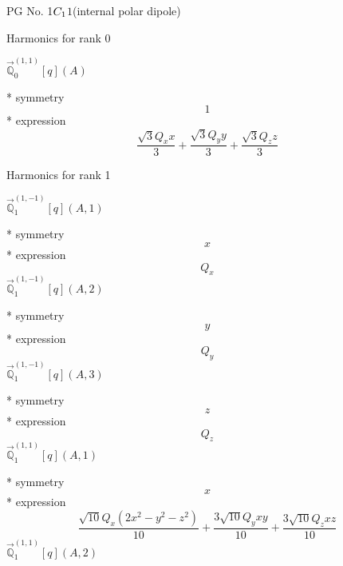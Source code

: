 \documentclass[fleqn,8pt]{jsarticle}
\begin{document}
\setcounter{MaxMatrixCols}{32}

\renewcommand{\tablename}{Table~}
\renewcommand{\figurename}{Figure~}
\begin{center}
\LARGE
PG No. 1\quad$C_{\rm 1}$\quad$1$\quad[ triclinic ] (internal polar dipole)
\end{center}

\noindent * Harmonics for rank 0

\noindent\quad $\vec{\mathbb{Q}}_{0}^{(1,1)}[q](A)$

\noindent\quad ** symmetry
\begin{dmath*}
1
\end{dmath*}
\noindent\quad ** expression
\begin{dmath*}
\frac{\sqrt{3} Q_{x} x}{3} + \frac{\sqrt{3} Q_{y} y}{3} + \frac{\sqrt{3} Q_{z} z}{3}
\end{dmath*}

\noindent * Harmonics for rank 1

\noindent\quad $\vec{\mathbb{Q}}_{1}^{(1,-1)}[q](A,1)$

\noindent\quad ** symmetry
\begin{dmath*}
x
\end{dmath*}
\noindent\quad ** expression
\begin{dmath*}
Q_{x}
\end{dmath*}
\noindent\quad $\vec{\mathbb{Q}}_{1}^{(1,-1)}[q](A,2)$

\noindent\quad ** symmetry
\begin{dmath*}
y
\end{dmath*}
\noindent\quad ** expression
\begin{dmath*}
Q_{y}
\end{dmath*}
\noindent\quad $\vec{\mathbb{Q}}_{1}^{(1,-1)}[q](A,3)$

\noindent\quad ** symmetry
\begin{dmath*}
z
\end{dmath*}
\noindent\quad ** expression
\begin{dmath*}
Q_{z}
\end{dmath*}
\noindent\quad $\vec{\mathbb{Q}}_{1}^{(1,1)}[q](A,1)$

\noindent\quad ** symmetry
\begin{dmath*}
x
\end{dmath*}
\noindent\quad ** expression
\begin{dmath*}
\frac{\sqrt{10} Q_{x} \left(2 x^{2} - y^{2} - z^{2}\right)}{10} + \frac{3 \sqrt{10} Q_{y} x y}{10} + \frac{3 \sqrt{10} Q_{z} x z}{10}
\end{dmath*}
\noindent\quad $\vec{\mathbb{Q}}_{1}^{(1,1)}[q](A,2)$
\end{document}

